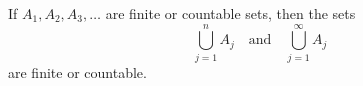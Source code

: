 If $A_1, A_2, A_3, \ldots$ are finite or countable sets, then the sets
$$\bigcup_{j=1}^{n} A_j \quad \text{and} \quad \bigcup_{j=1}^{\infty} A_j$$
are finite or countable.

